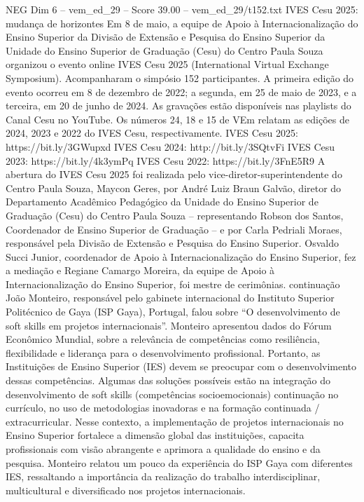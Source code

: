 \begin{textsample}{NEG Dim 6 – vem\_ed\_29 – Score 39.00 – vem\_ed\_29/t152.txt}  \label{ex:f6_neg_161}
IVES Cesu 2025: mudança de horizontes Em 8 de maio, a equipe de Apoio à Internacionalização do Ensino Superior da Divisão de Extensão e Pesquisa do Ensino Superior da Unidade do Ensino Superior de Graduação (Cesu) do Centro Paula Souza organizou o evento online IVES Cesu 2025 (International Virtual Exchange Symposium).
Acompanharam o simpósio 152 participantes.
A primeira edição do evento ocorreu em 8 de dezembro de 2022; a segunda, em 25 de maio de 2023, e a terceira, em 20 de junho de 2024.
As gravações estão disponíveis nas playlists do Canal Cesu no YouTube.
Os números 24, 18 e 15 de VEm relatam as edições de 2024, 2023 e 2022 do IVES Cesu, respectivamente.
IVES Cesu 2025: https://bit.ly/3GWupxd IVES Cesu 2024: http://bit.ly/3SQtvFi IVES Cesu 2023: https://bit.ly/4k3ymPq IVES Cesu 2022: https://bit.ly/3FnE5R9 A abertura do IVES Cesu 2025 foi realizada pelo vice-diretor-superintendente do Centro Paula Souza, Maycon Geres, por André Luiz Braun Galvão, diretor do Departamento Acadêmico Pedagógico da Unidade do Ensino Superior de Graduação (Cesu) do Centro Paula Souza – representando Robson dos Santos, Coordenador de Ensino Superior de Graduação – e por Carla Pedriali Moraes, responsável pela Divisão de Extensão e Pesquisa do Ensino Superior.
Osvaldo Succi Junior, coordenador de Apoio à Internacionalização do Ensino Superior, fez a mediação e Regiane Camargo Moreira, da equipe de Apoio à Internacionalização do Ensino Superior, foi mestre de cerimônias. continuação João Monteiro, responsável pelo gabinete internacional do Instituto Superior Politécnico de Gaya (ISP Gaya), Portugal, falou sobre “O desenvolvimento de soft skills em projetos internacionais”.
Monteiro apresentou dados do Fórum Econômico Mundial, sobre a relevância de competências como resiliência, flexibilidade e liderança para o desenvolvimento profissional.
Portanto, as Instituições de Ensino Superior (IES) devem se preocupar com o desenvolvimento dessas competências.
Algumas das soluções possíveis estão na integração do desenvolvimento de soft skills (competências socioemocionais) continuação no currículo, no uso de metodologias inovadoras e na formação continuada / extracurricular.
Nesse contexto, a implementação de projetos internacionais no Ensino Superior fortalece a dimensão global das instituições, capacita profissionais com visão abrangente e aprimora a qualidade do ensino e da pesquisa.
Monteiro relatou um pouco da experiência do ISP Gaya com diferentes IES, ressaltando a importância da realização do trabalho interdisciplinar, multicultural e diversificado nos projetos internacionais.

\end{textsample}
